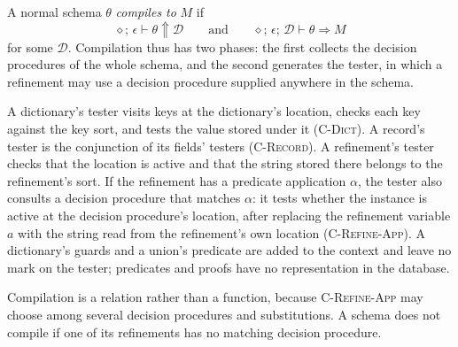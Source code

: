 \documentclass[11pt]{article}
\newcommand{\emptyctx}{\diamond}
\newcommand{\rulename}[1]{\textsc{#1}}
\newcommand{\supplies}[4]{#1;\, #2 \vdash #3 \Uparrow #4}
\newcommand{\compiles}[5]{#1;\, #2;\, #3 \vdash #4 \Rightarrow #5}
\theoremstyle{remark}
\begin{document}
A normal schema $\theta$ \emph{compiles to} $M$ if
\[ \supplies{\emptyctx}{\epsilon}{\theta}{\mathcal{D}} \qquad\text{and}\qquad
   \compiles{\emptyctx}{\epsilon}{\mathcal{D}}{\theta}{M} \]
for some $\mathcal{D}$. Compilation thus has two phases: the first collects the decision procedures
of the whole schema, and the second generates the tester, in which a refinement may use a decision
procedure supplied anywhere in the schema.

A dictionary's tester visits keys at the dictionary's location, checks each key against the key
sort, and tests the value stored under it (\rulename{C-Dict}). A record's tester is the conjunction
of its fields' testers (\rulename{C-Record}). A refinement's tester checks that the location is
active and that the string stored there belongs to the refinement's sort. If the refinement has a
predicate application $\alpha$, the tester also consults a decision procedure that matches
$\alpha$: it tests whether the instance is active at the decision procedure's location, after
replacing the refinement variable $a$ with the string read from the refinement's own location
(\rulename{C-Refine-App}). A dictionary's guards and a union's predicate are added to the context and leave no mark on the tester; predicates and
proofs have no representation in the database.

Compilation is a relation rather than a function, because \rulename{C-Refine-App} may choose among
several decision procedures and substitutions. A schema does not compile if one of its refinements
has no matching decision procedure.
\end{document}
